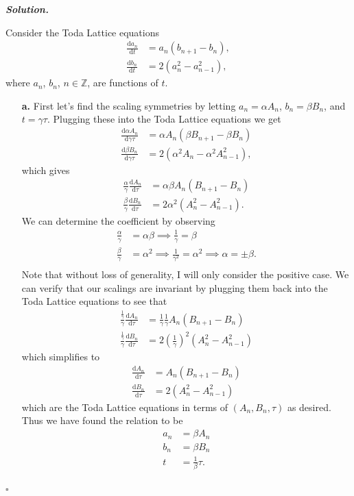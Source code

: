 \documentclass[12pt]{report}
\newenvironment{solution}[1][\it{Solution}]{\textbf{#1. } }{$\square$}
\newcommand{\dd}[2]{\frac{\mathrm{d} #1}{\mathrm{d} #2}} %
\begin{document}
\begin{solution}

    \noindent
    Consider the Toda Lattice equations
    \begin{align*}
        \dd{a_n}{t}&=a_n(b_{n+1}-b_n),\\
        \dd{b_n}{t}&=2(a_n^2-a_{n-1}^2),
    \end{align*}
    where $a_n$, $b_n$, $n\in \mathbb{Z}$, are functions of $t$. 
    \begin{enumerate}
        \item [{\bf a.}]
        First let's find the scaling symmetries by letting $a_n = \alpha A_n$, $b_n = \beta B_n$, and $t = \gamma \tau$. Plugging these into the Toda Lattice equations we get
        \begin{align*}
            \dd{\alpha A_n}{\gamma \tau} &= \alpha A_n (\beta B_{n+1} - \beta B_n)\\
            \dd{\beta B_n}{\gamma \tau} &= 2 (\alpha^2 A_n - \alpha^2 A^2_{n-1}),
        \end{align*}
        which gives
        \begin{align*}
            \frac{\alpha}{\gamma} \dd{A_n}{\tau} &= \alpha \beta A_n(B_{n+1} - B_n)\\
            \frac{\beta}{\gamma} \dd{B_n}{\tau} &= 2\alpha^2(A_n^2 - A_{n-1}^2).
        \end{align*}
        We can determine the coefficient by observing 
        \begin{align*}
            \frac{\alpha}{\gamma} &= \alpha \beta \implies \frac{1}{\gamma} = \beta\\
            \frac{\beta}{\gamma} &= \alpha^2 \implies \frac{1}{\gamma^2} = \alpha^2 \implies \alpha = \pm\beta.\\
        \end{align*}
        Note that without loss of generality, I will only consider the positive case. We can verify that our scalings are invariant by plugging them back into the Toda Lattice equations to see that
        \begin{align*}
            \frac{\frac{1}{\gamma}}{\gamma} \dd{A_n}{\tau} &= \frac{1}{\gamma} \frac{1}{\gamma}A_n(B_{n + 1} - B_n)\\
            \frac{\frac{1}{\gamma}}{\gamma} \dd{B_n}{\tau} &= 2 (\frac{1}{\gamma})^2(A_n^2 - A_{n-1}^2)
        \end{align*}
        which simplifies to
        \begin{align*}
            \dd{A_n}{\tau} &= A_n (B_{n+1} - B_n)\\
            \dd{B_n}{\tau} &= 2(A_n^2 - A_{n-1}^2)
        \end{align*}
        which are the Toda Lattice equations in terms of $(A_n, B_n, \tau)$ as desired. Thus we have found the relation to be
        \begin{align*}
            a_n &= \beta A_n\\
            b_n &= \beta B_n\\
            t &= \frac{1}{\beta}\tau.
        \end{align*}




\end{enumerate}
\end{solution}
\end{document}
